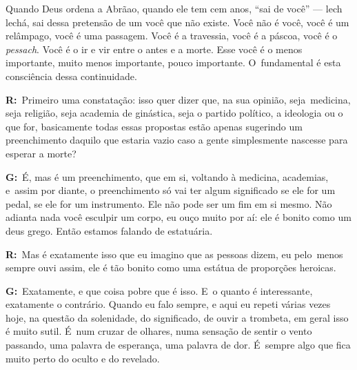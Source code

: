  

Quando Deus ordena a Abrãao, quando ele tem cem anos, ``sai de você''
--- lech lechá, sai dessa pretensão de um você que não existe. Você não
é você, você é um relâmpago, você é uma passagem. Você é a travessia,
você é a páscoa, você é o \emph{pessach}. Você é o ir e vir entre o antes e a
morte. Esse você é o menos importante, muito menos importante, pouco
importante. O~fundamental é esta consciência dessa continuidade.

 

\textbf{R:}~Primeiro uma constatação: isso quer dizer que, na sua
opinião, seja\textbf{}~medicina, seja religião, seja academia de
ginástica, seja o partido político, a ideologia ou o que for,
basicamente todas essas propostas estão apenas sugerindo um
preenchimento daquilo que estaria vazio caso a gente simplesmente
nascesse para esperar a morte?

 

\textbf{G:}~É, mas é um preenchimento, que em si, voltando à medicina,
academias, e\textbf{}~assim por diante, o preenchimento só vai ter algum
significado se ele for um pedal, se ele for um instrumento. Ele não pode
ser um fim em si mesmo. Não adianta nada você esculpir um corpo, eu ouço
muito por aí: ele é bonito como um deus grego. Então estamos falando de
estatuária.

 

\textbf{R:}~Mas é exatamente isso que eu imagino que as pessoas dizem,
eu pelo\textbf{}~menos sempre ouvi assim, ele é tão bonito como uma
estátua de proporções heroicas.

 

\textbf{G:}~Exatamente, e que coisa pobre que é isso. E~o quanto é
interessante, exatamente o contrário. Quando eu falo sempre, e aqui eu
repeti várias vezes hoje, na questão da solenidade, do significado, de
ouvir a trombeta, em geral isso é muito sutil. É~num cruzar de olhares,
numa sensação de sentir o vento passando, uma palavra de esperança, uma
palavra de dor. É~sempre algo que fica muito perto do oculto e do
revelado.%

\fechafala 
